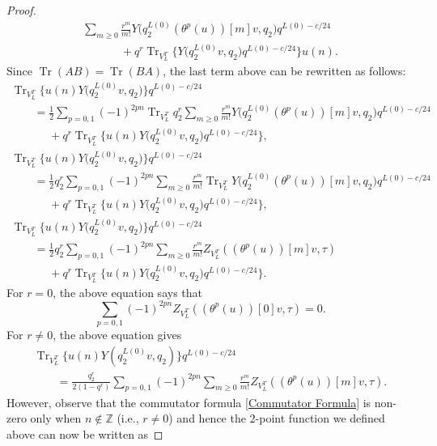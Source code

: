 \documentclass[pdftex]{sigma}
\numberwithin{equation}{section}
\theoremstyle{definition}
\begin{document}
\begin{proof}
\begin{gather}
 \sum_{m \ge 0} \frac{r^m}{m!}
 Y\bigl(q_2^{L(0)}(\theta^p(u))[m]v, q_2\bigr)
 q^{L(0)-c/24} \nonumber \\
\phantom{\qquad=}{} + q^r \operatorname{Tr}_{V_L^T} \bigl\{ Y\bigl(q_2^{L(0)}v, q_2\bigr) q^{L(0)-c/24} \bigr\} u(n).\label{eq:trace-commutation}
\end{gather}
Since $\operatorname{Tr}(AB)=\operatorname{Tr}(BA)$, the last term above can be rewritten as follows:
\begin{gather*}%
\operatorname{Tr}_{V_L^T} \bigl\{ u(n)Y\bigl(q_2^{L(0)}v, q_2\bigr)\bigr\} q^{L(0)-c/24}
\\
\qquad= \frac{1}{2} \sum_{p=0,1} (-1)^{2pn}
 \operatorname{Tr}_{V_L^T} q_2^r
 \sum_{m \ge 0} \frac{r^m}{m!}
 Y\bigl(q_2^{L(0)}(\theta^p(u))[m]v, q_2\bigr)
 q^{L(0)-c/24} \\
\phantom{\qquad=}{} + q^r \operatorname{Tr}_{V_L^T} \bigl\{ u(n) Y\bigl(q_2^{L(0)}v, q_2\bigr) q^{L(0)-c/24} \bigr\},
\\
\operatorname{Tr}_{V_L^T} \bigl\{ u(n)Y\bigl(q_2^{L(0)}v, q_2\bigr)\bigr\} q^{L(0)-c/24}\\
\qquad= \frac{1}{2} q_2^r \sum_{p=0,1} (-1)^{2pn} \sum_{m \geq 0} \frac{r^m}{m!} \operatorname{Tr}_{V_L^T} Y\bigl(q_2^{L(0)}(\theta^p(u))[m]v, q_2\bigr) q^{L(0)-c/24}\\
\phantom{\qquad=}{} + q^r \operatorname{Tr}_{V_L^T} \bigl\{ u(n) Y\bigl(q_2^{L(0)}v, q_2\bigr) q^{L(0)-c/24} \bigr\},
\\
\operatorname{Tr}_{V_L^T} \bigl\{ u(n)Y\bigl(q_2^{L(0)}v, q_2\bigr)\bigr\} q^{L(0)-c/24}\\
\qquad= \frac{1}{2}q_2^r\sum_{p=0,1}(-1)^{2pn}\sum_{m\geq 0}\frac{r^m}{m!}Z_{V_L^T}((\theta^p(u))[m]v, \tau) \\
\phantom{\qquad=}{}+ q^r\operatorname{Tr}_{V_L^T}\bigl\{u(n)Y\bigl(q_2^{L(0)}v,q_2\bigr)q^{L(0)-c/24}\bigr\}.
\end{gather*}
For $r=0$, the above equation says that
\[%
 \sum_{p=0,1}(-1)^{2pn}Z_{V_L^T}((\theta^p(u))[0]v, \tau)=0.
\]
For $r\neq 0$, the above equation gives
\begin{gather}
 \operatorname{Tr}_{V_L^T}\bigl\{ u(n)Y(q_2^{L(0)}v, q_2)\bigr\}q^{L(0)-c/24}\nonumber\\
 \qquad=\frac{q_2^r}{2(1-q^r)}\sum_{p=0,1}(-1)^{2pn}\sum_{m\geq 0}\frac{r^m}{m!}Z_{V_L^T}((\theta^p(u))[m]v, \tau).\label{non-zero r}
\end{gather}
However, observe that the commutator formula \eqref{Commutator Formula} is non-zero only when $n\notin \mathbb{Z}$ (i.e., $r\neq 0$) and hence the 2-point function we defined above can now be written as

\end{proof}
\end{document}
